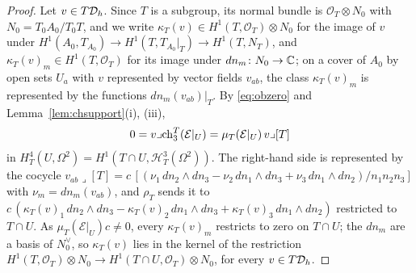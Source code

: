 \begin{proof}
Let $v\in T\mathcal{D}_{h}$. Since $T$ is a subgroup, its normal bundle is $\mathcal{O}_{T}\otimes N_{0}$ with $N_{0}=T_{0}A_{0}/T_{0}T$, and we write $\kappa_{T}(v)\in H^{1}(T,\mathcal{O}_{T})\otimes N_{0}$ for the image of $v$ under $H^{1}(A_{0},T_{A_{0}})\to H^{1}(T,T_{A_{0}}|_{T})\to H^{1}(T,N_{T})$, and $\kappa_{T}(v)_{m}\in H^{1}(T,\mathcal{O}_{T})$ for its image under $dn_{m}\colon N_{0}\to\mathbb{C}$; on a cover of $A_{0}$ by open sets $U_{a}$ with $v$ represented by vector fields $v_{ab}$, the class $\kappa_{T}(v)_{m}$ is represented by the functions $dn_{m}(v_{ab})|_{T}$. By \eqref{eq:obzero} and Lemma~\ref{lem:chsupport}(i), (iii),
\[
0=v\lrcorner\mathrm{ch}^{T}_{3}(\mathcal{E}|_{U})=\mu_{T}(\mathcal{E}|_{U})\,v\lrcorner[T]
\]
in $H^{4}_{T}(U,\Omega^{2})=H^{1}(T\cap U,\mathcal{H}^{3}_{T}(\Omega^{2}))$.
The right-hand side is represented by the cocycle $v_{ab}\lrcorner[T]=c\,[(\nu_{1}\,dn_{2}\wedge dn_{3}-\nu_{2}\,dn_{1}\wedge dn_{3}+\nu_{3}\,dn_{1}\wedge dn_{2})/n_{1}n_{2}n_{3}]$ with $\nu_{m}=dn_{m}(v_{ab})$, and $\rho_{T}$ sends it to $c\,(\kappa_{T}(v)_{1}\,dn_{2}\wedge dn_{3}-\kappa_{T}(v)_{2}\,dn_{1}\wedge dn_{3}+\kappa_{T}(v)_{3}\,dn_{1}\wedge dn_{2})$ restricted to $T\cap U$. As $\mu_{T}(\mathcal{E}|_{U})c\ne0$, every $\kappa_{T}(v)_{m}$ restricts to zero on $T\cap U$; the $dn_{m}$ are a basis of $N_{0}^{\vee}$, so $\kappa_{T}(v)$ lies in the kernel of the restriction $H^{1}(T,\mathcal{O}_{T})\otimes N_{0}\to H^{1}(T\cap U,\mathcal{O}_{T})\otimes N_{0}$, for every $v\in T\mathcal{D}_{h}$.


\end{proof}
